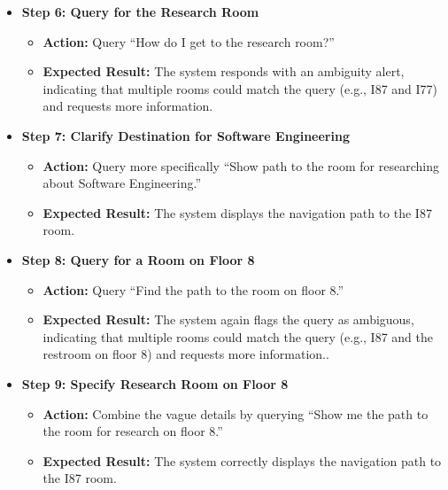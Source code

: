 \begin{itemize}
    \item \textbf{Step 6: Query for the Research Room}
    \begin{itemize}
        \item \textbf{Action:} Query “How do I get to the research room?”
        \item \textbf{Expected Result:} The system responds with an ambiguity alert, indicating that multiple rooms could match the query (e.g., I87 and I77) and requests more information.
    \end{itemize}
    
    \item \textbf{Step 7: Clarify Destination for Software Engineering}
    \begin{itemize}
        \item \textbf{Action:} Query more specifically “Show path to the room for researching about Software Engineering.”
        \item \textbf{Expected Result:} The system displays the navigation path to the I87 room.
    \end{itemize}
    
    \item \textbf{Step 8: Query for a Room on Floor 8}
    \begin{itemize}
        \item \textbf{Action:} Query “Find the path to the room on floor 8.”
        \item \textbf{Expected Result:} The system again flags the query as ambiguous, indicating that multiple rooms could match the query (e.g., I87 and the restroom on floor 8) and requests more information..
    \end{itemize}
    
    \item \textbf{Step 9: Specify Research Room on Floor 8}
    \begin{itemize}
        \item \textbf{Action:} Combine the vague details by querying “Show me the path to the room for research on floor 8.”
        \item \textbf{Expected Result:} The system correctly displays the navigation path to the I87 room.
    \end{itemize}
\end{itemize}

